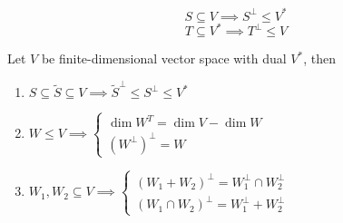 \begin{lemma} 
    \[
        S \subseteq V \implies S^{\perp} \leq V^*
    \]
    \[
        T \subseteq V^* \implies T^{\perp} \leq V
    \]
\end{lemma}

\begin{theorem}
    Let $V$ be finite-dimensional vector space with dual $V^*$, then 
    \begin{enumerate}
        \item $S \subseteq \tilde{S} \subseteq V \implies \tilde{S}^{\perp} \leq S^{\perp} \leq V^*$ 
        \item $W \leq V \implies \begin{cases}
        \dim W^T = \dim V - \dim W \\
        (W^{\perp})^{\perp} = W
        \end{cases}$
        \item $W_1, W_2 \subseteq V \implies 
        \begin{cases}
            (W_1 + W_2)^{\perp} = W_1^{\perp} \cap W_2^{\perp} \\
            (W_1 \cap W_2)^{\perp} = W_1^{\perp} + W_2^{\perp}
        \end{cases}$
    \end{enumerate}
\end{theorem}

